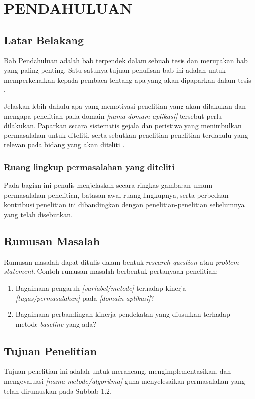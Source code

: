 \chapter{PENDAHULUAN}

\section{Latar Belakang}
Bab Pendahuluan adalah bab terpendek dalam sebuah tesis dan merupakan bab yang paling penting. Satu-satunya tujuan penulisan bab ini adalah untuk memperkenalkan kepada pembaca tentang apa yang akan dipaparkan dalam tesis \citep{russell2020}.

Jelaskan lebih dahulu apa yang memotivasi penelitian yang akan dilakukan dan mengapa penelitian pada domain \textit{[nama domain aplikasi]} tersebut perlu dilakukan. Paparkan secara sistematis gejala dan peristiwa yang menimbulkan permasalahan untuk diteliti, serta sebutkan penelitian-penelitian terdahulu yang relevan pada bidang yang akan diteliti \citep{goh2009}.

\subsection{Ruang lingkup permasalahan yang diteliti}
Pada bagian ini penulis menjelaskan secara ringkas gambaran umum permasalahan penelitian, batasan awal ruang lingkupnya, serta perbedaan kontribusi penelitian ini dibandingkan dengan penelitian-penelitian sebelumnya yang telah disebutkan.

\section{Rumusan Masalah}
Rumusan masalah dapat ditulis dalam bentuk \textit{research question} atau \textit{problem statement}. Contoh rumusan masalah berbentuk pertanyaan penelitian:
\begin{enumerate}
    \item Bagaimana pengaruh \textit{[variabel/metode]} terhadap kinerja \textit{[tugas/permasalahan]} pada \textit{[domain aplikasi]}?
    \item Bagaimana perbandingan kinerja pendekatan yang diusulkan terhadap metode \textit{baseline} yang ada?
\end{enumerate}

\section{Tujuan Penelitian}
Tujuan penelitian ini adalah untuk merancang, mengimplementasikan, dan mengevaluasi \textit{[nama metode/algoritma]} guna menyelesaikan permasalahan yang telah dirumuskan pada Subbab 1.2.

